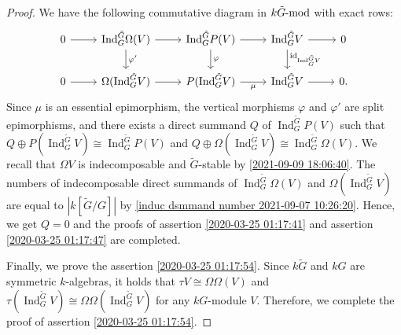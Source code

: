 \documentclass[pdftex,a4paper]{article}
\numberwithin{equation}{subsection}
\theoremstyle{definition}
\newcommand{\lmod}{\operatorname{\mathrm{\hspace{-2pt}-mod}}}
\newcommand{\induc}{{\operatorname{Ind}\nolimits}}
\begin{document}
\begin{proof}

	We have the following commutative diagram in \(k\tilde{G}\lmod\) with exact rows:
	\begin{equation}
		\begin{tikzcd}
			0\ar[r]&\induc_G^{\tilde{G}}\Omega(V) \ar[r] \ar[d,"\varphi'"]& \induc_G^{\tilde{G}}P(V) \ar[r] \ar[d,"\varphi"]& \induc_G^{\tilde{G}} V\ar[r] \ar[d,"\mathrm{id}_{\induc_G^{\tilde{G}} V}"]&0\\
			0\ar[r]&\Omega (\induc_G^{\tilde{G}} V) \ar[r]& P(\induc_G^{\tilde{G}} V) \ar[r,"\mu"']&\induc_G^{\tilde{G}} V\ar[r]&0.
		\end{tikzcd}
	\end{equation}
	Since \(\mu\) is an essential epimorphism, the vertical morphisms \(\varphi\) and \(\varphi'\) are split epimorphisms,
	and there exists a direct summand \(Q\) of \(\induc_G^{\tilde{G}}P (V)\) such that \(Q\oplus P(\induc_G^{\tilde{G}}V)\cong \induc_G^{\tilde{G}}P (V)\) and \(Q\oplus \Omega (\induc_G^{\tilde{G}} V) \cong \induc_G^{\tilde{G}} \Omega (V)\). We recall that \(\Omega V\) is indecomposable and \(\tilde{G}\)-stable by \cref{2021-09-09 18:06:40}.
	The numbers of indecomposable direct summands of \(\induc_G^{\tilde{G}} \Omega(V)\) and \(\Omega (\induc_G^{\tilde{G}} V)\) are equal to \(|k[\tilde{G}/G]|\) by \cref{induc dsmmand number 2021-09-07 10:26:20}.
	Hence, we get \(Q=0\) and the proofs of assertion \ref{2020-03-25 01:17:41} and assertion \ref{2020-03-25 01:17:47} are completed.

	Finally, we prove the assertion \ref{2020-03-25 01:17:54}.
	Since \(k\tilde{G}\) and \(kG\) are symmetric \(k\)-algebras, it holds that \(\tau V\cong \Omega \Omega(V)\) and \(\tau(\induc_G^{\tilde{G}} V)\cong \Omega \Omega (\induc_G^{\tilde{G}} V)\) for any \(kG\)-module \(V\).
	Therefore, we complete the proof of assertion \ref{2020-03-25 01:17:54}.
\end{proof}
\end{document}
